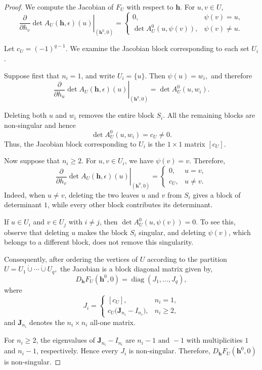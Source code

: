 \documentclass[10pt,a4paper]{amsart}
\begin{document}
\begin{proof}
We compute the Jacobian of \(F_U\) with respect to \(\mathbf h\).
For \(u,v\in U\),
\[
\left.
\frac{\partial}{\partial h_v}
\det A_U(\mathbf h,\epsilon)(u)
\right|_{(\mathbf h^0,0)}
=
\begin{cases}
0,
& \psi(v)=u,\\[1mm]
\det A_U^0(u,\psi(v)),
& \psi(v)\neq u.
\end{cases}
\]

Let
\(
c_U=(-1)^{q-1}.
\)
We examine the Jacobian block corresponding to each set \(U_i\).

Suppose first that \(n_i=1\), and write \(U_i=\{u\}\). Then
\(
\psi(u)=w_i,
\)
and therefore
\[
\left.
\frac{\partial}{\partial h_u}
\det A_U(\mathbf h,\epsilon)(u)
\right|_{(\mathbf h^0,0)}
=
\det A_U^0(u,w_i).
\]

Deleting both \(u\) and \(w_i\) removes the entire block \(S_i\).
All the remaining blocks are non-singular and hence
\[
\det A_U^0(u,w_i)=c_U\neq0.
\]
Thus, the Jacobian block corresponding to \(U_i\) is the
\(1\times1\) matrix
\(
[c_U].
\)

Now suppose that \(n_i\geq2\). For \(u,v\in U_i\), we have
\(\psi(v)=v\). Therefore,
\[
\left.
\frac{\partial}{\partial h_v}
\det A_U(\mathbf h,\epsilon)(u)
\right|_{(\mathbf h^0,0)}
=
\begin{cases}
0, & u=v,\\
c_U, & u\neq v.
\end{cases}
\]
Indeed, when \(u\neq v\), deleting the two leaves \(u\) and \(v\)
from \(S_i\) gives a block of determinant \(1\), while every other
block contributes its determinant.

If \(u\in U_i\) and \(v\in U_j\) with \(i\neq j\), then
\(
\det A_U^0(u,\psi(v))=0.
\)
To see this, observe that deleting \(u\) makes the block \(S_i\)
singular, and deleting \(\psi(v)\), which belongs to a different
block, does not remove this singularity.

Consequently, after ordering the vertices of \(U\) according to the
partition
\(
U=U_1\mathbin{\dot\cup}\cdots\mathbin{\dot\cup}U_q,
\)
the Jacobian is a block diagonal matrix given by,
\[
D_{\mathbf h}F_U(\mathbf h^0,0)
=
\operatorname{diag}(J_1,\ldots,J_q),
\]
where
\[
J_i=
\begin{cases}
[c_U], & n_i=1,\\[2mm]
c_U\bigl(\mathbf J_{n_i}-I_{n_i}\bigr), & n_i\geq2,
\end{cases}
\]
and \(\mathbf J_{n_i}\) denotes the \(n_i\times n_i\) all-one
matrix.

For \(n_i\geq2\), the eigenvalues of
\(\mathbf J_{n_i}-I_{n_i}\) are
\(
n_i-1
\text{ and } 
-1
\)
with multiplicities \(1\) and \(n_i-1\), respectively. Hence every
\(J_i\) is non-singular. Therefore,
\(
D_{\mathbf h}F_U(\mathbf h^0,0)
\)
is non-singular.


\end{proof}
\end{document}
